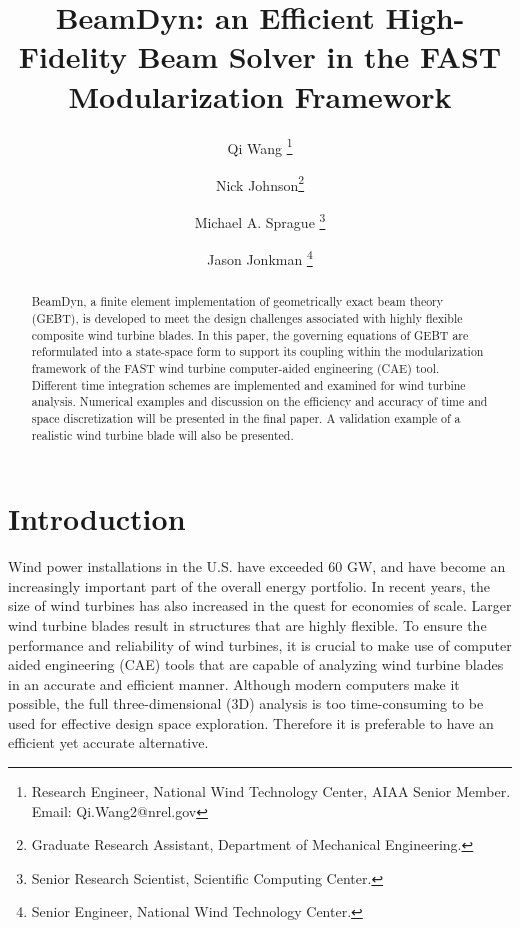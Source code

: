 \documentclass{aiaa-tc}
\title{BeamDyn: an Efficient High-Fidelity Beam Solver in the FAST Modularization Framework}
\author[1]{Qi Wang  \thanks{Research Engineer, National Wind Technology Center, AIAA Senior Member. Email: Qi.Wang2@nrel.gov}}
\author[2]{Nick Johnson\thanks{Graduate Research Assistant, Department of
Mechanical Engineering.}}
\author[1]{Michael A. Sprague \thanks{Senior Research Scientist, Scientific Computing Center.}}
\author[1]{Jason Jonkman \thanks{Senior Engineer, National Wind Technology Center.}}
\affil[1]{National Renewable Energy Laboratory, Golden, CO 80401}
\affil[2]{Colorado School of Mines, Golden, CO 80401}
\begin{document}
\maketitle

\begin{abstract}
{ BeamDyn, a finite element implementation of geometrically exact beam theory (GEBT), is developed to meet the design challenges associated with highly flexible composite wind turbine blades. In this paper, the governing equations of GEBT are reformulated into a state-space form to support its coupling within the modularization framework of the FAST wind turbine computer-aided engineering (CAE) tool. Different time integration schemes are implemented and examined for wind turbine analysis. Numerical examples and discussion on the efficiency and accuracy of time and space discretization will be presented in the final paper. A validation example of a realistic wind turbine blade will also be presented.}     
\end{abstract}

\section{Introduction}
Wind power installations in the U.S. have exceeded 60 GW, and have become an increasingly important part of the overall energy portfolio. In recent years, the size of wind turbines has also increased in the quest for economies of scale.  Larger wind turbine blades result in structures that are highly flexible.  To ensure the performance and reliability of wind turbines, it is crucial to make use of computer aided engineering (CAE) tools that are capable of analyzing wind turbine blades in an accurate and efficient manner. Although modern computers make it possible, the full three-dimensional (3D) analysis is too time-consuming to be used for effective design space exploration. Therefore it is preferable to have an efficient yet accurate alternative.  
\end{document}
